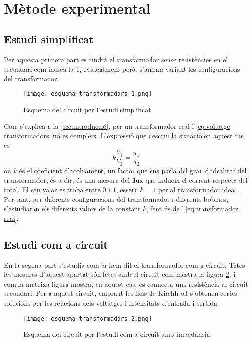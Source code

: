 \section{Mètode experimental}\label{sec:met}
\subsection{Estudi simplificat}
Per aquesta primera part es tindrà el transformador sense resistències en el secundari com indica la \cref{fig:esquema 1}, evidentment però, s'aniran variant les configuracions del transformador.

\begin{figure}[htb]
  \centering \small \sffamily
  \texttt{[image: esquema-transformadors-1.png]}
  \caption{Esquema del circuit per l'estudi simplificat}
  \label{fig:esquema 1}
\end{figure}

Com s'explica a la \cref{sec:introducció}, per un transformador real l'\cref{eq:voltatge transformadors} no es compleix. L'expressió que descriu la situació en aquest cas és 
\begin{equation}\label{eq:transformador real}
  k\frac{V_1}{V_2}=\frac{n_1}{n_2}
\end{equation}
on $k$ és el coeficient d'acoblament, un factor que ens parla del grau d'idealitat del transformador, és a dir, és una mesura del flux que indueix el corrent respecte del total. El seu valor es troba entre $0$ i $1$, éssent $k=1$ per al transformador ideal. Per tant, per diferents configuracions del transformador i diferents bobines, s'estudiaran els diferents valors de la constant $k$, fent ús de l'\cref{eq:transformador real}.

\subsection{Estudi com a circuit}\label{sec:metcirc}
En la segona part s'estudia com ja hem dit el transformador com a circuit. Totes les mesures d'aquest apartat són fetes amb el circuit com mostra la figura \cref{fig:esq2}, i com la mateixa figura mostra, en aquest cas, es connecta una resistència al circuit secundari. Per a aquest circuit, emprant les lleis de Kirchh
off s'obtenen certes solucions per les relacions dels voltatges i intensitats d'entrada i sortida. 

\begin{figure}[htbp!]
  \centering \small \sffamily
  \texttt{[image: esquema-transformadors-2.png]}
  \caption{Esquema del circuit per l'estudi com a circuit amb impedància}
  \label{fig:esq2}
\end{figure}

